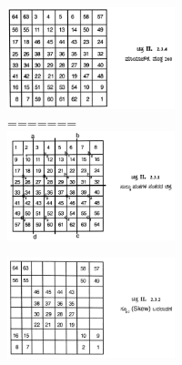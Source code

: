 \begin{figure}[H]
\begin{figure}[H]
\begin{figure}[h]
\begin{figure}[H]
\end{figure}
\begin{figure}[H]
\includegraphics{src/figures/chap3/fig3-27.jpg}
=======
\includegraphics[scale=.85]{src/figures/chap3/fig3.24.jpg}
\end{figure}
\begin{figure}[H]
\includegraphics[scale=.85]{src/figures/chap3/fig3.25.jpg}

\end{figure}
\end{figure}
\end{figure}
\end{figure}
